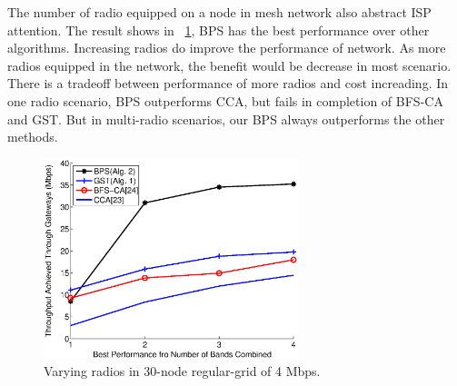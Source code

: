 
The number of radio equipped on a node in mesh network also abstract ISP attention. 
The result shows in ~\ref{fig:varyradios}, BPS has the best performance over other algorithms. 
Increasing radios do improve the performance of network. 
As more radios equipped in the network, the benefit would be decrease in most scenario. 
There is a tradeoff between performance of more radios and cost increading.
In one radio scenario, BPS outperforms CCA, but fails in completion of BFS-CA and GST.
But in multi-radio scenarios, our BPS always outperforms the other methods.


\begin{figure}
\centering
\includegraphics[width=74mm]{figures/varyradios}
\vspace{-0.1in}
\caption{Varying radios in 30-node regular-grid of 4 Mbps.}                                                                               
\label{fig:varyradios}
\end{figure}






